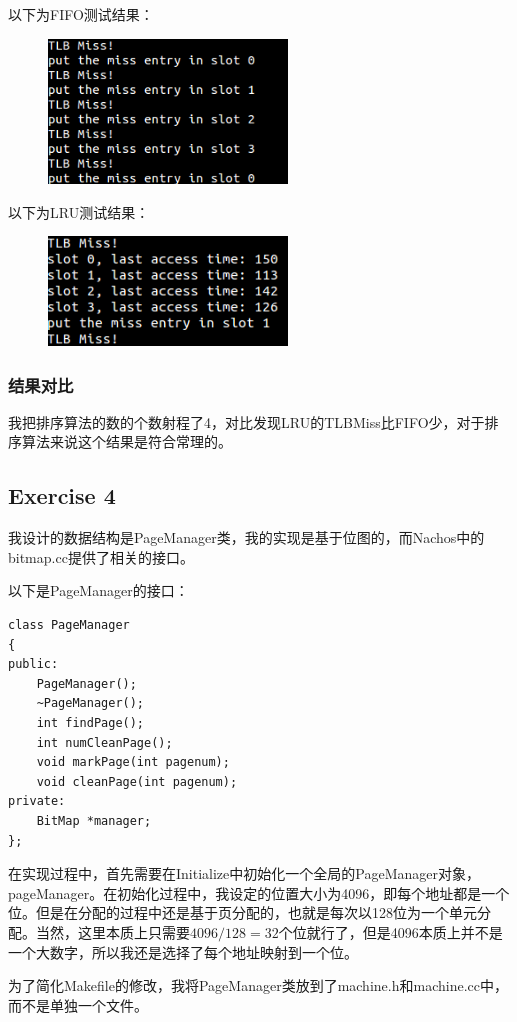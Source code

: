 \documentclass[nofonts]{ctexart}
\begin{document}
以下为FIFO测试结果：
\begin{figure}[h!]
\includegraphics[width=2.5in]{fifo.png}
\end{figure}

以下为LRU测试结果：
\begin{figure}[h!]
\includegraphics[width=2.5in]{lru.png}
\end{figure}

\subsubsection*{结果对比}
我把排序算法的数的个数射程了4，对比发现LRU的TLBMiss比FIFO少，对于排序算法来说这个结果是符合常理的。



\subsection*{Exercise 4}
我设计的数据结构是PageManager类，我的实现是基于位图的，而Nachos中的bitmap.cc提供了相关的接口。

以下是PageManager的接口：
\begin{lstlisting}
class PageManager
{
public:
	PageManager();
	~PageManager();
	int findPage();
	int numCleanPage();
	void markPage(int pagenum);
	void cleanPage(int pagenum);
private:
	BitMap *manager;
};
\end{lstlisting}

在实现过程中，首先需要在Initialize中初始化一个全局的PageManager对象，pageManager。在初始化过程中，我设定的位置大小为4096，即每个地址都是一个位。但是在分配的过程中还是基于页分配的，也就是每次以128位为一个单元分配。当然，这里本质上只需要$4096/128=32$个位就行了，但是4096本质上并不是一个大数字，所以我还是选择了每个地址映射到一个位。

为了简化Makefile的修改，我将PageManager类放到了machine.h和machine.cc中，而不是单独一个文件。
\end{document}
